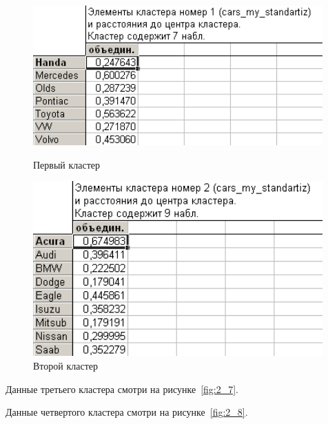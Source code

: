 \begin{figure}[!h]
  \centering
  \begin{minipage}{0.49\textwidth}
    \centering

    \includegraphics[width=0.99\textwidth]
    {inc/cars_my/2.5.PNG}

    \caption{Первый кластер}
    \label{fig:2_5}
  \end{minipage}
  \begin{minipage}{0.49\textwidth}
    \centering

    \includegraphics[width=0.99\textwidth]
    {inc/cars_my/2.6.PNG}

    \caption{Второй кластер}
    \label{fig:2_6}
  \end{minipage}
\end{figure}

Данные третьего кластера смотри на рисунке~\ref{fig:2_7}.

Данные четвертого кластера смотри на рисунке~\ref{fig:2_8}.

